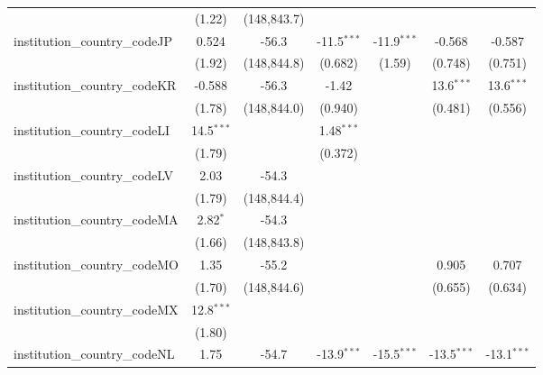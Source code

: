 \begin{tabular}{lcccccc}
                                         & (1.22)        & (148,843.7)   &               &               &               &   \\   
   institution\_country\_codeJP          & 0.524         & -56.3         & -11.5$^{***}$ & -11.9$^{***}$ & -0.568        & -0.587\\   
                                         & (1.92)        & (148,844.8)   & (0.682)       & (1.59)        & (0.748)       & (0.751)\\   
   institution\_country\_codeKR          & -0.588        & -56.3         & -1.42         &               & 13.6$^{***}$  & 13.6$^{***}$\\   
                                         & (1.78)        & (148,844.0)   & (0.940)       &               & (0.481)       & (0.556)\\   
   institution\_country\_codeLI          & 14.5$^{***}$  &               & 1.48$^{***}$  &               &               &   \\   
                                         & (1.79)        &               & (0.372)       &               &               &   \\   
   institution\_country\_codeLV          & 2.03          & -54.3         &               &               &               &   \\   
                                         & (1.79)        & (148,844.4)   &               &               &               &   \\   
   institution\_country\_codeMA          & 2.82$^{*}$    & -54.3         &               &               &               &   \\   
                                         & (1.66)        & (148,843.8)   &               &               &               &   \\   
   institution\_country\_codeMO          & 1.35          & -55.2         &               &               & 0.905         & 0.707\\   
                                         & (1.70)        & (148,844.6)   &               &               & (0.655)       & (0.634)\\   
   institution\_country\_codeMX          & 12.8$^{***}$  &               &               &               &               &   \\   
                                         & (1.80)        &               &               &               &               &   \\   
   institution\_country\_codeNL          & 1.75          & -54.7         & -13.9$^{***}$ & -15.5$^{***}$ & -13.5$^{***}$ & -13.1$^{***}$\\   

\end{tabular}
